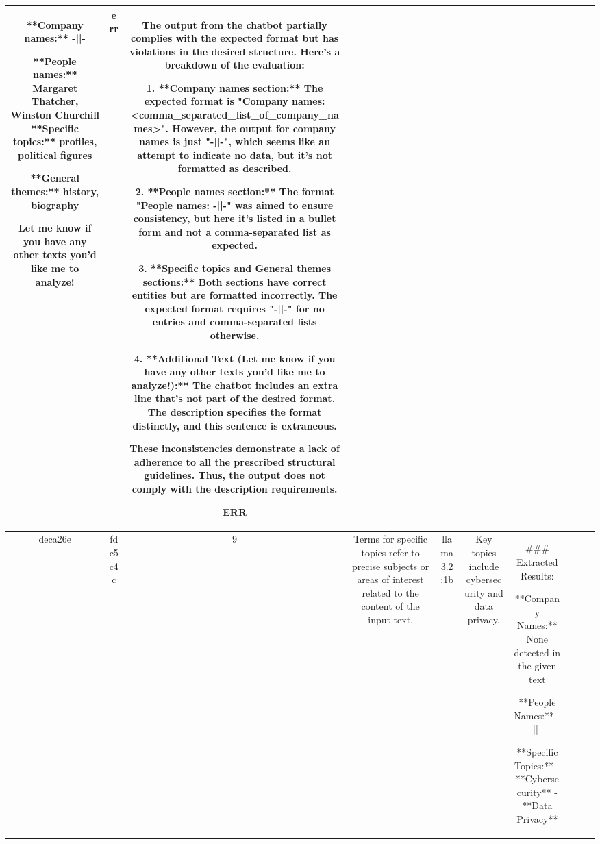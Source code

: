 \begin{table}[h!]
\begin{tabular}{|c|c|c|c|c|c|c|c|c|c|}
**Company names:**  
 -||- 

**People names:** Margaret Thatcher, Winston Churchill 
**Specific topics:**  profiles, political figures

**General themes:**  history, biography 


Let me know if you have any other texts you'd like me to analyze! 
 & err & The output from the chatbot partially complies with the expected format but has violations in the desired structure. Here's a breakdown of the evaluation:

1. **Company names section:** The expected format is "Company names: <comma_separated_list_of_company_names>". However, the output for company names is just "-||-", which seems like an attempt to indicate no data, but it's not formatted as described.

2. **People names section:** The format "People names: -||-" was aimed to ensure consistency, but here it's listed in a bullet form and not a comma-separated list as expected.

3. **Specific topics and General themes sections:** Both sections have correct entities but are formatted incorrectly. The expected format requires "-||-" for no entries and comma-separated lists otherwise.

4. **Additional Text (Let me know if you have any other texts you'd like me to analyze!):** The chatbot includes an extra line that's not part of the desired format. The description specifies the format distinctly, and this sentence is extraneous.

These inconsistencies demonstrate a lack of adherence to all the prescribed structural guidelines. Thus, the output does not comply with the description requirements. 

ERR & \\
\hline
deca26e & fdc5c4c & 9 & Terms for specific topics refer to precise subjects or areas of interest related to the content of the input text. & llama3.2:1b & Key topics include cybersecurity and data privacy. & ### Extracted Results:

**Company Names:** None detected in the given text

**People Names:** -||-

**Specific Topics:** 
- **Cybersecurity**
- **Data Privacy**


\end{tabular}
\end{table}
